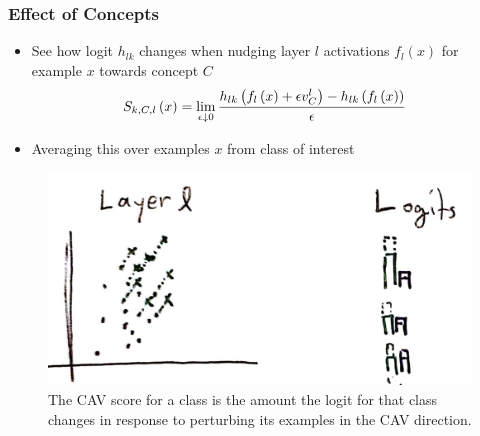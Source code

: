 \documentclass[10pt,mathserif]{beamer}
\begin{document}
\begin{frame}
  \frametitle{Effect of Concepts}
  \begin{itemize}
  \item See how logit $h_{lk}$ changes when nudging layer $l$ activations
    $f_{l}\left(x\right)$ for example $x$ towards concept $C$
    \begin{align*}
      S_{k, C, l}\left(x\right) &= \lim_{\epsilon \downarrow 0} \frac{h_{lk}\left(f_{l}\left(x\right) + \epsilon v_{C}^l\right) - h_{lk}\left(f_l\left(x\right)\right)}{\epsilon}
    \end{align*} 
  \item Averaging this over examples $x$ from class of interest
  \end{itemize} 
\begin{figure}[ht]
  \centering
  \includegraphics[width=0.6\paperwidth]{figure/cav_derivs}
  \caption{The CAV score for a class is the amount the logit for that class
    changes in response to perturbing its examples in the CAV
    direction. \label{fig:cav_derivs} }
\end{figure}
\end{frame}
\end{document}
